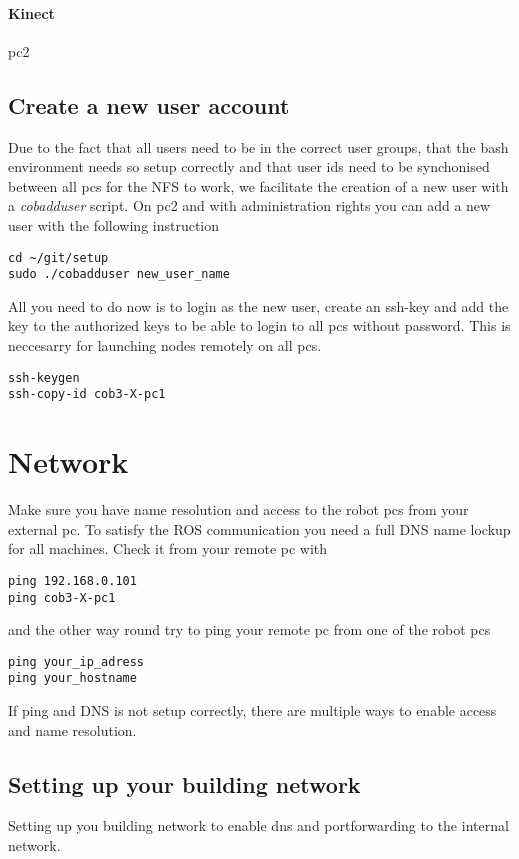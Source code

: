 \paragraph{Kinect}
pc2


\subsection{Create a new user account}
\label{sec:account}
Due to the fact that all users need to be in the correct user groups, that the bash environment needs so setup correctly and that user ids need to be synchonised between all pcs for the NFS to work, we facilitate the creation of a new user with a \textit{cobadduser} script. On pc2 and with administration rights you can add a new user with the following instruction
\begin{lstlisting}
cd ~/git/setup
sudo ./cobadduser new_user_name
\end{lstlisting}

All you need to do now is to login as the new user, create an ssh-key and add the key to the authorized keys to be able to login to all pcs without password. This is neccesarry for launching nodes remotely on all pcs.
\begin{lstlisting}
ssh-keygen
ssh-copy-id cob3-X-pc1
\end{lstlisting}


\section{Network}
Make sure you have name resolution and access to the robot pcs from your external pc. To satisfy the ROS communication you need a full DNS name lockup for all machines. Check it from your remote pc with
\begin{lstlisting}
ping 192.168.0.101
ping cob3-X-pc1
\end{lstlisting}
and the other way round try to ping your remote pc from one of the robot pcs
\begin{lstlisting}
ping your_ip_adress
ping your_hostname
\end{lstlisting}

If ping and DNS is not setup correctly, there are multiple ways to enable access and name resolution.

\subsection{Setting up your building network}
Setting up you building network to enable dns and portforwarding to the internal network.

